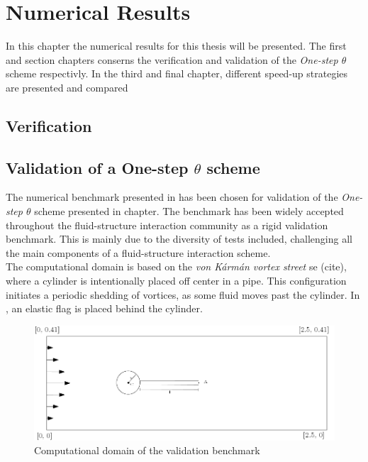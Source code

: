 \chapter{Numerical Results}

In this chapter the numerical results for this thesis will be presented. The first and section chapters conserns the verification and validation of the \textit{One-step $\theta$} scheme respectivly. In the third and final chapter, different speed-up strategies are presented and compared

\section{Verification}


\section{Validation of a One-step $\theta$ scheme}
The numerical benchmark presented in \cite{Hron2006} has been chosen for validation of the \textit{One-step $\theta$} scheme presented in chapter. The benchmark has been widely accepted throughout the fluid-structure interaction community as a rigid validation benchmark. This is mainly due to the diversity of tests included, challenging all the main components of a fluid-structure interaction scheme. \\

The computational domain is based on the \textit{von Kármán vortex street} se (cite), where a cylinder is intentionally placed off center in a pipe. This configuration initiates a periodic shedding of vortices, as some fluid moves past the cylinder. In \cite{Hron2006}, an elastic flag is placed behind the cylinder. \\

\begin{figure}[h!]
  \centering
    \includegraphics[scale=0.5]{./Fig/turekflag.png}
      \caption{Computational domain of the validation benchmark}
\end{figure}
\newpage


